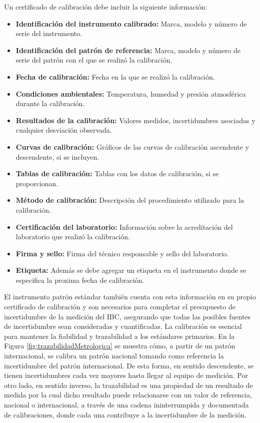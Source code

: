 Un certificado de calibración debe incluir la siguiente información:

\begin{itemize}
    \item \textbf{Identificación del instrumento calibrado:} Marca, modelo y número de serie del instrumento.
    \item \textbf{Identificación del patrón de referencia:} Marca, modelo y número de serie del patrón con el que se realizó la calibración.
    \item \textbf{Fecha de calibración:} Fecha en la que se realizó la calibración.
    \item \textbf{Condiciones ambientales:} Temperatura, humedad y presión atmosférica durante la calibración.
    \item \textbf{Resultados de la calibración:} Valores medidos, incertidumbres asociadas y cualquier desviación observada.
    \item \textbf{Curvas de calibración:} Gráficos de las curvas de calibración ascendente y descendente, si se incluyen.
    \item \textbf{Tablas de calibración:} Tablas con los datos de calibración, si se proporcionan.
    \item \textbf{Método de calibración:} Descripción del procedimiento utilizado para la calibración.
    \item \textbf{Certificación del laboratorio:} Información sobre la acreditación del laboratorio que realizó la calibración.
    \item \textbf{Firma y sello:} Firma del técnico responsable y sello del laboratorio.
    \item \textbf{Etiqueta:} Además se debe agregar un etiqueta en el instrumento donde se especifica la proxima fecha de calibración.
\end{itemize}

El instrumento patrón estándar también cuenta con esta información en su propio certificado de calibración y son necesarios para completar el presupuesto de incertidumbre de la medición del IBC, asegurando que todas las posibles fuentes de incertidumbre sean consideradas y cuantificadas. La calibración es esencial para mantener la fiabilidad y trazabilidad a los estándares primarios. En la Figura \ref{fig:trazabilidadMetrologica} se muestra cómo, a partir de un patrón internacional, se calibra un patrón nacional tomando como referencia la incertidumbre del patrón internacional. De esta forma, en sentido descendente, se tienen incertidumbres cada vez mayores hasta llegar al equipo de medición. Por otro lado, en sentido inverso, la trazabilidad es una propiedad de un resultado de medida por la cual dicho resultado puede relacionarse con un valor de referencia, nacional o internacional, a través de una cadena ininterrumpida y documentada de calibraciones, donde cada una contribuye a la incertidumbre de la medición.

